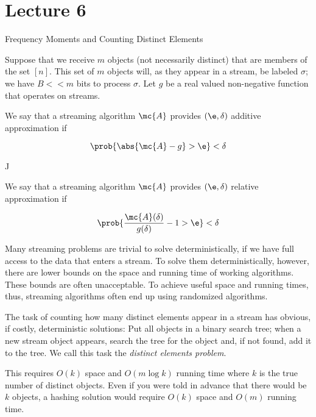 \documentclass[../main.tex]{subfiles}
\begin{document}
\section{Lecture 6}{Frequency Moments and Counting Distinct Elements}

\begin{definition}
    Suppose that we receive $m$ objects (not necessarily
    distinct) that are members of the set $[n]$.
    This set of $m$ objects will, as they appear in a stream,
    be labeled $\sigma$; we have $B << m$ bits to process
    $\sigma$. Let $g$
    be a real valued non-negative function that operates on
    streams.
\end{definition}
\begin{definition}
    We say that a streaming algorithm $\mc{A}$ provides 
    $(\e, \delta)$ additive approximation if

    \[
        \prob{\abs{\mc{A} - g} > \e} < \delta
    \]
\end{definition}
J
\begin{definition}
    We say that a streaming algorithm $\mc{A}$ provides 
    $(\e, \delta)$ relative approximation if

    \[
        \prob{\frac{\mc{A}(\delta)}{g(\delta)} - 1 > \e} < \delta
    \]
\end{definition}

\begin{remark}
    Many streaming problems are trivial to solve deterministically, if we have full access to the data that enters a stream. To solve them deterministically, however, there are lower bounds on the space and running time of working algorithms. These bounds are often unacceptable. To achieve useful space and running times, thus, streaming algorithms often end up using randomized algorithms.
\end{remark}

\begin{remark}
    The task of counting how many distinct elements appear in a stream has obvious, if costly, deterministic solutions: Put all objects in a binary search tree; when a new stream object appears, search the tree for the object and, if not found, add it to the tree. We call this task the \textit{distinct elements problem}.

    This requires $O(k)$ space and $O(m \log k)$ running time where $k$ is the true number of distinct objects. Even if you were told in advance that there would be $k$ objects, a hashing solution would require $O(k)$ space and $O(m)$ running time.
\end{remark}
\end{document}
